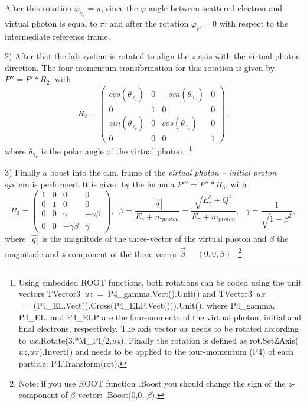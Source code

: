 After this rotation $\varphi_{\gamma_v} = \pi$, since the $\varphi$ angle between scattered electron and virtual photon is equal to $\pi$; and after the rotation $\varphi_{e'} = 0$ with respect to the intermediate reference frame.

2) After that the lab system is rotated to align the $z$-axis with the virtual photon direction. The four-momentum transformation for this rotation is given by $P'' = P'*R_2$, with 
\begin{equation}
R_{2}=\begin{pmatrix}
cos(\theta_{\gamma_{v}}) &0  &-sin(\theta_{\gamma_{v}})  &0 \\ 
 0& 1 & 0 &0 \\ 
 sin(\theta_{\gamma_{v}}) &0  &cos(\theta_{\gamma_{v}})  & 0\\ 
0 &0  & 0 &1 
\end{pmatrix},
\end{equation}
where $\theta_{\gamma_v}$ is the polar angle of the virtual photon.~\footnote[2]{Using embedded ROOT functions, both rotations can be coded using the unit vectors TVector3~$uz$~=~P4\_gamma.Vect().Unit() and 
 TVector3~$ux$~=~(P4\_EL.Vect().Cross(P4\_ELP.Vect())).Unit(), where P4\_gamma, P4\_EL, and P4\_ELP are the four-momenta of the virtual photon, initial and final electrons, respectively. 
 The axis vector $ux$ needs to be rotated according to $ux$.Rotate(3.*M\_PI/2,$uz$).
Finally the rotation is defined as rot.SetZAxis($uz$,$ux$).Invert() and needs to be applied to the four-momentum (P4) of each particle:
 P4.Transform(rot).}

3) Finally a boost into the c.m. frame of the {\em virtual photon -- initial proton} system is performed. It is given by the formula $P''' = P''*R_3$, with 
\begin{equation}
R_{3} = \begin{pmatrix}
1 &0  &0  &0 \\ 
0 &1  &0  &0 \\ 
 0&  0& \gamma  &-\gamma \beta  \\ 
 0&  0& -\gamma \beta  & \gamma 
\end{pmatrix}, \, \, \, \beta =\frac{|\overrightarrow{q}|}{E_{\gamma }+m_{proton}}=\frac{\sqrt{E^{2}_{\gamma }+Q^{2}}}{E_{\gamma }+m_{proton}}, \, \, \,\,  \gamma =\frac{1}{\sqrt{1-\beta ^{2}}},
\end{equation}
where $|\overrightarrow{q}|$ is the magnitude of the three-vector of the virtual photon and $\beta$ the magnitude and $z$-component of the three-vector $\overrightarrow{\beta}=(0,0,\beta)$.~\footnote[3]{
Note: if you use ROOT function .Boost you should change the sign of the $z$-component of $\beta$-vector: .Boost(0,0,-$\beta$).}


